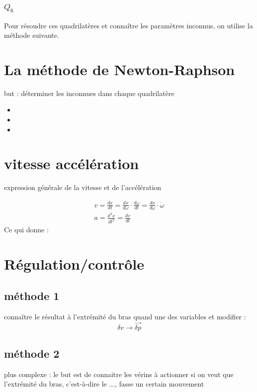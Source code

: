 \documentclass[12pt,a4paper]{article}
\begin{document}
\subsubsection{$Q_6$}

Pour résoudre ces quadrilatères et connaître les paramètres inconnus, on utilise la méthode suivante. 
\newpage
\section{La méthode de Newton-Raphson}
but : déterminer les inconnues dans chaque quadrilatère

\begin{itemize}
	\item 
	\item 
	\item 
\end{itemize}


\section{vitesse accélération}


expression générale de la vitesse et de l'accélération

\begin{eqnarray}
v=\frac{d x}{dt}=\frac{d x}{d \omega} \cdot \frac{d \omega}{dt}=\frac{d x}{d \omega} \cdot \dot{\omega}\\
a=\frac{d^2 x}{dt^2}=\frac{dv}{dt}
\end{eqnarray}
Ce qui donne : 


\section{Régulation/contrôle}

\subsection{méthode 1}
connaître le résultat à l'extrémité du bras quand une des variables et modifier : 
\begin{equation}
\delta v \rightarrow \vec{\delta p}
\end{equation}

\subsection{méthode 2}
plus complexe : 
le but est de connaitre les vérins à actionner si on veut que l'extrémité du bras, c'est-à-dire le ..., fasse un certain mouvement
\end{document}
